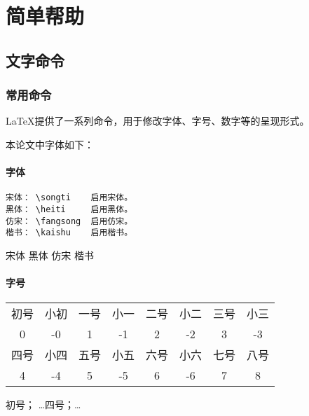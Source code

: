 \chapter{简单帮助}
\section{文字命令}
\subsection{常用命令}
\LaTeX 提供了一系列命令，用于修改字体、字号、数字等的呈现形式。

本论文中字体如下：
\subsubsection{字体}
\begin{verbatim}
宋体： \songti    启用宋体。
黑体： \heiti     启用黑体。
仿宋： \fangsong  启用仿宋。
楷书： \kaishu    启用楷书。
\end{verbatim}
{\songti 宋体} {\heiti 黑体}    {\fangsong 仿宋}     {\kaishu 楷书}
\subsubsection{字号}%
\begin{center}
	\begin{tabular}{cccccccc}
		\toprule
		初号 & 小初 & 一号 & 小一 & 二号 & 小二 & 三号 & 小三 \\
		0 & -0 & 1 & -1 & 2 & -2 & 3 & -3 \\
		\hline
		四号 & 小四 & 五号 & 小五 & 六号 & 小六 & 七号 & 八号 \\
		4 & -4 & 5 & -5 & 6 & -6 & 7 & 8 \\
		\bottomrule
	\end{tabular}
\end{center}
{初号}； \dots {四号}；\dots {}